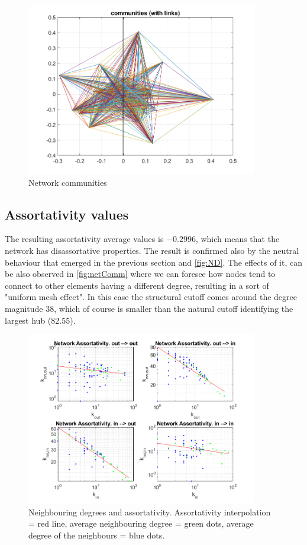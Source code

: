 \documentclass[12pt,a4paper]{article}
\begin{document}
\begin{figure}
\centering
  \includegraphics[width = 0.9\textwidth]{img/NetworkCommunities}
\caption{Network communities}
\label{fig:netComm}
\end{figure}

\subsection*{Assortativity values}
The resulting assortativity average values is $-0.2996$, which means that the network has disassortative properties. The result is confirmed also by the neutral behaviour that emerged in the previous section and \autoref{fig:ND}. The effects of it, can be also observed in \autoref{fig:netComm} where we can foresee how nodes tend to connect to other elements having a different degree, resulting in a sort of "uniform mesh effect". In this case the structural cutoff comes around the degree magnitude $38$, which of course is smaller than the natural cutoff identifying the largest hub ($82.55$).

\begin{figure}
\centering
  \includegraphics[width = 0.9\textwidth]{img/Assortativity}
\caption{Neighbouring degrees and assortativity. Assortativity interpolation = red line, average neighbouring degree = green dots, average degree of the neighbours = blue dots.}
\label{fig:ND}
\end{figure}
\end{document}
